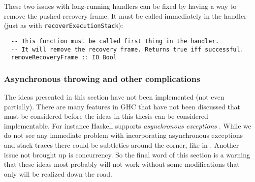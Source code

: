 These two issues with long-running handlers can be fixed by having a
way to remove the pushed recovery frame. It must be called immediately
in the handler (just as with \texttt{recoverExecutionStack}):

\begin{verbatim}
  -- This function must be called first thing in the handler.
  -- It will remove the recovery frame. Returns true iff successful.
  removeRecoveryFrame :: IO Bool
\end{verbatim}

\subsubsection{Asynchronous throwing and other complications}

The ideas presented in this section have not been implemented (not
even partially). There are many features in GHC that have not been
discussed that must be considered before the ideas in this thesis
can be considered implementable. For instance Haskell supports
\emph{asynchronous exceptions} \cite{marlow2001asynchronous}. While
we do not see any immediate problem with incorporating asynchronous
exceptions and stack traces there could be subtleties around the corner,
like in \cite{edsko_dark_corners_of_throwTo}. Another issue not brought
up is concurrency. So the final word of this section is a warning that
these ideas most probably will not work without some modifications that
only will be realized down the road.
